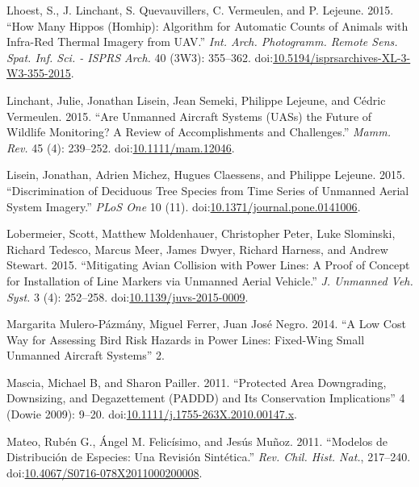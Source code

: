 \documentclass[]{interact}
\theoremstyle{plain}%
\theoremstyle{definition}
\theoremstyle{remark}
\begin{document}
\hypertarget{ref-lhoest_how_2015}{}
Lhoest, S., J. Linchant, S. Quevauvillers, C. Vermeulen, and P. Lejeune.
2015. ``How Many Hippos (Homhip): Algorithm for Automatic Counts of
Animals with Infra-Red Thermal Imagery from UAV.'' \emph{Int. Arch.
Photogramm. Remote Sens. Spat. Inf. Sci. - ISPRS Arch.} 40 (3W3):
355--362.
doi:\href{https://doi.org/10.5194/isprsarchives-XL-3-W3-355-2015}{10.5194/isprsarchives-XL-3-W3-355-2015}.

\hypertarget{ref-linchant_are_2015}{}
Linchant, Julie, Jonathan Lisein, Jean Semeki, Philippe Lejeune, and
Cédric Vermeulen. 2015. ``Are Unmanned Aircraft Systems (UASs) the
Future of Wildlife Monitoring? A Review of Accomplishments and
Challenges.'' \emph{Mamm. Rev.} 45 (4): 239--252.
doi:\href{https://doi.org/10.1111/mam.12046}{10.1111/mam.12046}.

\hypertarget{ref-lisein_discrimination_2015}{}
Lisein, Jonathan, Adrien Michez, Hugues Claessens, and Philippe Lejeune.
2015. ``Discrimination of Deciduous Tree Species from Time Series of
Unmanned Aerial System Imagery.'' \emph{PLoS One} 10 (11).
doi:\href{https://doi.org/10.1371/journal.pone.0141006}{10.1371/journal.pone.0141006}.

\hypertarget{ref-lobermeier_mitigating_2015}{}
Lobermeier, Scott, Matthew Moldenhauer, Christopher Peter, Luke
Slominski, Richard Tedesco, Marcus Meer, James Dwyer, Richard Harness,
and Andrew Stewart. 2015. ``Mitigating Avian Collision with Power Lines:
A Proof of Concept for Installation of Line Markers via Unmanned Aerial
Vehicle.'' \emph{J. Unmanned Veh. Syst.} 3 (4): 252--258.
doi:\href{https://doi.org/10.1139/juvs-2015-0009}{10.1139/juvs-2015-0009}.

\hypertarget{ref-margarita_mulero-pazmany_juan_jose_negro_low_2014}{}
Margarita Mulero-Pázmány, Miguel Ferrer, Juan José Negro. 2014. ``A Low
Cost Way for Assessing Bird Risk Hazards in Power Lines: Fixed-Wing
Small Unmanned Aircraft Systems'' 2.

\hypertarget{ref-mascia_protected_2011}{}
Mascia, Michael B, and Sharon Pailler. 2011. ``Protected Area
Downgrading, Downsizing, and Degazettement (PADDD) and Its Conservation
Implications'' 4 (Dowie 2009): 9--20.
doi:\href{https://doi.org/10.1111/j.1755-263X.2010.00147.x}{10.1111/j.1755-263X.2010.00147.x}.

\hypertarget{ref-mateo_modelos_2011}{}
Mateo, Rubén G., Ángel M. Felicísimo, and Jesús Muñoz. 2011. ``Modelos
de Distribución de Especies: Una Revisión Sintética.'' \emph{Rev. Chil.
Hist. Nat.}, 217--240.
doi:\href{https://doi.org/10.4067/S0716-078X2011000200008}{10.4067/S0716-078X2011000200008}.
\end{document}
